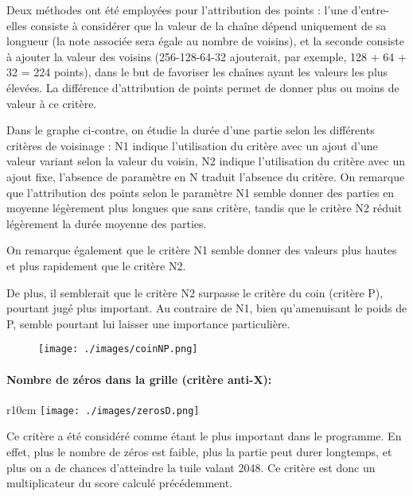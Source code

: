 \documentclass[a4paper]{report}
\begin{document}
Deux méthodes ont été employées pour l’attribution des points : l’une d’entre-elles consiste à considérer que la valeur de la chaîne dépend uniquement de sa longueur (la note associée sera égale au nombre de voisins), et la seconde consiste à ajouter la valeur des voisins (256-128-64-32 ajouterait, par exemple, 128 + 64 + 32 = 224 points), dans le but de favoriser les chaînes ayant les valeurs les plus élevées. La différence d’attribution de points permet de donner plus ou moins de valeur à ce critère.

Dans le graphe ci-contre, on étudie la durée d’une partie selon les différents critères de voisinage : N1 indique l’utilisation du critère avec un ajout d’une valeur variant selon la valeur du voisin, N2 indique l’utilisation du critère avec un ajout fixe, l’absence de paramètre en N traduit l’absence du critère.
On remarque que l’attribution des points selon le paramètre N1 semble donner des parties en moyenne légèrement plus longues que sans critère, tandis que le critère N2 réduit légèrement la durée moyenne des parties.

\begin{figure}[h!]
\null\hfill
{}
\hfill
{}
\hfill\null
\end{figure}

On remarque également que le critère N1 semble donner des valeurs plus hautes et plus rapidement que le critère N2.

De plus, il semblerait que le critère N2 surpasse le critère du coin (critère P), pourtant jugé plus important. Au contraire de N1, bien qu’amenuisant le poids de P, semble pourtant lui laisser une importance particulière.

\begin{figure}[h]
\begin{center}
\texttt{[image: ./images/coinNP.png]}
\end{center}
\end{figure}

\newpage
\paragraph{Nombre de zéros dans la grille (critère anti-X):}

\begin{wrapfigure}[24]{r}{10cm}
\texttt{[image: ./images/zerosD.png]}
\end{wrapfigure}
Ce critère a été considéré comme étant le plus important dans le programme. En effet, plus le nombre de zéros est faible, plus la partie peut durer longtemps, et plus on a de chances d’atteindre la tuile valant 2048. Ce critère est donc un multiplicateur du score calculé précédemment.
\end{document}
